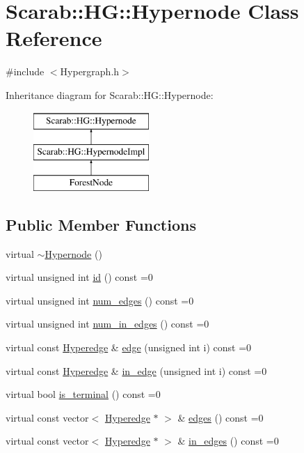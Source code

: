\hypertarget{classScarab_1_1HG_1_1Hypernode}{
\section{Scarab::HG::Hypernode Class Reference}
\label{classScarab_1_1HG_1_1Hypernode}
}


{\ttfamily \#include $<$Hypergraph.h$>$}

Inheritance diagram for Scarab::HG::Hypernode:\begin{figure}[H]
\begin{center}
\leavevmode
\includegraphics[height=3cm]{classScarab_1_1HG_1_1Hypernode}
\end{center}
\end{figure}
\subsection*{Public Member Functions}
\begin{DoxyCompactItemize}
\item 
virtual \hyperlink{classScarab_1_1HG_1_1Hypernode_a0657cc96f62d29da3ae4b5b9bcab1ce6}{$\sim$Hypernode} ()
\item 
virtual unsigned int \hyperlink{classScarab_1_1HG_1_1Hypernode_a0aeaee6c2ca2a011fcd086f803aaa4d0}{id} () const =0
\item 
virtual unsigned int \hyperlink{classScarab_1_1HG_1_1Hypernode_add2f4d556be223b906bfbab9f1b60870}{num\_\-edges} () const =0
\item 
virtual unsigned int \hyperlink{classScarab_1_1HG_1_1Hypernode_a4b1a4ffaa8a8b0295763673e6d86d693}{num\_\-in\_\-edges} () const =0
\item 
virtual const \hyperlink{classScarab_1_1HG_1_1Hyperedge}{Hyperedge} \& \hyperlink{classScarab_1_1HG_1_1Hypernode_a3bface6832eb54a00d90e4fe8d1999f7}{edge} (unsigned int i) const =0
\item 
virtual const \hyperlink{classScarab_1_1HG_1_1Hyperedge}{Hyperedge} \& \hyperlink{classScarab_1_1HG_1_1Hypernode_a533d3e0bc2269ec07edbda32305daf70}{in\_\-edge} (unsigned int i) const =0
\item 
virtual bool \hyperlink{classScarab_1_1HG_1_1Hypernode_ae3e1107309a8817d1015bd70a90c1c49}{is\_\-terminal} () const =0
\item 
virtual const vector$<$ \hyperlink{classScarab_1_1HG_1_1Hyperedge}{Hyperedge} $\ast$ $>$ \& \hyperlink{classScarab_1_1HG_1_1Hypernode_a3306572ded5b5061c1916bcf268be94e}{edges} () const =0
\item 
virtual const vector$<$ \hyperlink{classScarab_1_1HG_1_1Hyperedge}{Hyperedge} $\ast$ $>$ \& \hyperlink{classScarab_1_1HG_1_1Hypernode_aad118748408663b8242dc52d45bbd49d}{in\_\-edges} () const =0
\end{DoxyCompactItemize}


